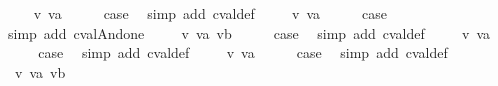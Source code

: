 \begin{isabellebody}
\isamarkupfalse%
\isanewline
\ \ \isamarkupfalse%
\ {\isacharparenleft}{\isachardoublequoteopen}{}{\isacharunderscore}{}{}{\isachardoublequoteclose}\ v\ va{\isacharparenright}\isanewline
\ \ \isamarkupfalse%
\ \isamarkupfalse%
\ {\isacharquery}case\ \isamarkupfalse%
\ {\isacharparenleft}simp\ add{\isacharcolon}\ cval{\isacharunderscore}def{\isacharparenright}\isanewline
{}\isamarkupfalse%
\isanewline
\ \ \isamarkupfalse%
\ {\isacharparenleft}{\isachardoublequoteopen}{}{\isacharunderscore}{}{}{\isachardoublequoteclose}\ v\ va{\isacharparenright}\isanewline
\ \ \isamarkupfalse%
\ \isamarkupfalse%
\ {\isacharquery}case\isanewline
\ \ \ \ \isamarkupfalse%
\ {\isacharparenleft}simp\ add{\isacharcolon}\ cval{\isacharunderscore}And{\isacharunderscore}one{\isacharparenright}\isanewline
{}\isamarkupfalse%
\isanewline
\ \ \isamarkupfalse%
\ {\isacharparenleft}{\isachardoublequoteopen}{}{\isacharunderscore}{}{}{\isachardoublequoteclose}\ v\ va\ vb{\isacharparenright}\isanewline
\ \ \isamarkupfalse%
\ \isamarkupfalse%
\ {\isacharquery}case\ \isamarkupfalse%
\ {\isacharparenleft}simp\ add{\isacharcolon}\ cval{\isacharunderscore}def{\isacharparenright}\isanewline
{}\isamarkupfalse%
\isanewline
\ \ \isamarkupfalse%
\ {\isacharparenleft}{\isachardoublequoteopen}{}{\isacharunderscore}{}{}{\isachardoublequoteclose}\ v\ va{\isacharparenright}\isanewline
\ \ \isamarkupfalse%
\ \isamarkupfalse%
\ {\isacharquery}case\ \isamarkupfalse%
\ {\isacharparenleft}simp\ add{\isacharcolon}\ cval{\isacharunderscore}def{\isacharparenright}\isanewline
{}\isamarkupfalse%
\isanewline
\ \ \isamarkupfalse%
\ {\isacharparenleft}{\isachardoublequoteopen}{}{\isacharunderscore}{}{}{\isachardoublequoteclose}\ v\ va{\isacharparenright}\isanewline
\ \ \isamarkupfalse%
\ \isamarkupfalse%
\ {\isacharquery}case\ \isamarkupfalse%
\ {\isacharparenleft}simp\ add{\isacharcolon}\ cval{\isacharunderscore}def{\isacharparenright}\isanewline
{}\isamarkupfalse%
\isanewline
{}\isamarkupfalse%
\ {\isacharparenleft}{\isachardoublequoteopen}{}{\isacharunderscore}{}{}{\isachardoublequoteclose}\ v\ va\ vb{\isacharparenright}\isanewline

\end{isabellebody}
